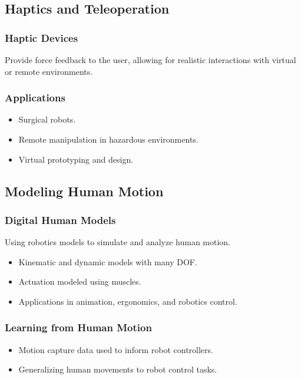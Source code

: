 \documentclass{article}
\begin{document}
\subsection{Haptics and Teleoperation}

\subsubsection{Haptic Devices}

Provide force feedback to the user, allowing for realistic interactions with virtual or remote environments.

\subsubsection{Applications}

\begin{itemize}
    \item Surgical robots.
    \item Remote manipulation in hazardous environments.
    \item Virtual prototyping and design.
\end{itemize}

\subsection{Modeling Human Motion}

\subsubsection{Digital Human Models}

Using robotics models to simulate and analyze human motion.

\begin{itemize}
    \item Kinematic and dynamic models with many DOF.
    \item Actuation modeled using muscles.
    \item Applications in animation, ergonomics, and robotics control.
\end{itemize}

\subsubsection{Learning from Human Motion}

\begin{itemize}
    \item Motion capture data used to inform robot controllers.
    \item Generalizing human movements to robot control tasks.
\end{itemize}
\end{document}
